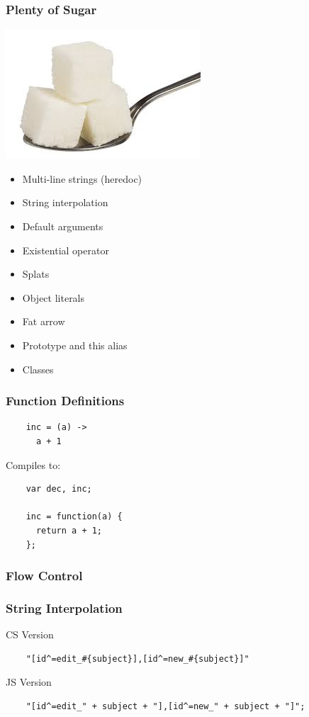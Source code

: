 \documentclass{beamer}
\begin{document}

\begin{frame}
  \frametitle{Plenty of Sugar}
  \includegraphics[scale=.40]{sugar}
%
%
  \begin{itemize}
    \item Multi-line strings (heredoc)
    \item String interpolation
    \item Default arguments
    \item Existential operator
    \item Splats
    \item Object literals
    \item Fat arrow
    \item Prototype and this alias
    \item Classes
  \end{itemize}
\end{frame}


\begin{frame}[fragile]
  \frametitle{Function Definitions}

  \begin{verbatim}
    inc = (a) ->
      a + 1
  \end{verbatim}

  Compiles to:
  \begin{verbatim}
    var dec, inc;

    inc = function(a) {
      return a + 1;
    };    
  \end{verbatim}  
\end{frame}

\begin{frame}
\frametitle{Flow Control}
\end{frame}


\begin{frame}[fragile]
  \frametitle{String Interpolation}
  CS Version
  \begin{verbatim}
    "[id^=edit_#{subject}],[id^=new_#{subject}]"
  \end{verbatim}
  JS Version
  \begin{verbatim}
    "[id^=edit_" + subject + "],[id^=new_" + subject + "]";
  \end{verbatim}  
\end{frame}
\end{document}
